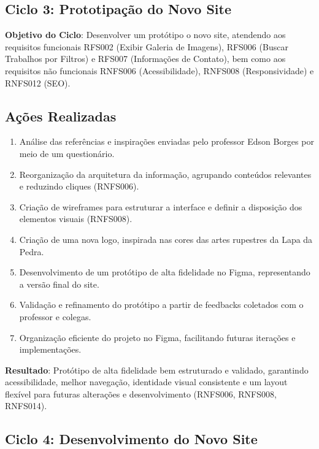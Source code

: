 \subsection*{Ciclo 3: Prototipação do Novo Site} \label{subsec:ciclo3}

\textbf{Objetivo do Ciclo}: Desenvolver um protótipo o novo site, atendendo aos requisitos funcionais RFS002 (Exibir Galeria de Imagens), RFS006 (Buscar Trabalhos por Filtros) e RFS007 (Informações de Contato), bem como aos requisitos não funcionais RNFS006 (Acessibilidade), RNFS008 (Responsividade) e RNFS012 (SEO).

\subsection{Ações Realizadas}
\begin{enumerate}
    \item Análise das referências e inspirações enviadas pelo professor Edson Borges por meio de um questionário.
    \item Reorganização da arquitetura da informação, agrupando conteúdos relevantes e reduzindo cliques (RNFS006).
    \item Criação de wireframes para estruturar a interface e definir a disposição dos elementos visuais (RNFS008).
    \item Criação de uma nova logo, inspirada nas cores das artes rupestres da Lapa da Pedra.
    \item Desenvolvimento de um protótipo de alta fidelidade no Figma, representando a versão final do site.
    \item Validação e refinamento do protótipo a partir de feedbacks coletados com o professor e colegas.
    \item Organização eficiente do projeto no Figma, facilitando futuras iterações e implementações.
\end{enumerate}

\textbf{Resultado}: Protótipo de alta fidelidade bem estruturado e validado, garantindo acessibilidade, melhor navegação, identidade visual consistente e um layout flexível para futuras alterações e desenvolvimento (RNFS006, RNFS008, RNFS014).
\subsection*{Ciclo 4: Desenvolvimento do Novo Site} \label{subsec:ciclo4}

